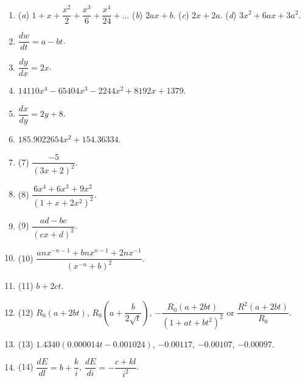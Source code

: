 \documentclass[a4paper,11pt,openany]{ltjsbook}
\begin{document}
\begin{enumerate}
\item[(1)] (\textit{a}) $1 + x + \dfrac{x^2}{2} + \dfrac{x^3}{6} + \dfrac{x^4}{24} + \ldots$ \qquad
    (\textit{b}) $2ax + b$. \qquad (\textit{c}) $2x + 2a$.
    (\textit{d}) $3x^2 + 6ax + 3a^2$.
\item[(2)] $\dfrac{dw}{dt} = a - bt$.
\item[(3)] $\dfrac{dy}{dx} = 2x$.
\item[(4)] $14110x^4 - 65404x^3 - 2244x^2 + 8192x + 1379$.
\item[(5)] $\dfrac{dx}{dy} = 2y + 8$.
\item[(6)] $185.9022654x^2 + 154.36334$.
\item (7) \(\dfrac{-5}{(3x + 2)^2}\).
\item (8) \(\dfrac{6x^4 + 6x^3 + 9x^2}{(1 + x + 2x^2)^2}\).
\item (9) \(\dfrac{ad - bc}{(cx + d)^2}\).
\item (10) \(\dfrac{anx^{-n-1} + bnx^{n-1} + 2nx^{-1}}{(x^{-n} + b)^2}\).
\item (11) \(b + 2ct\).
\item (12) \(R_0(a + 2bt)\), \quad \(R_0 \left(a + \dfrac{b}{2\sqrt{t}}\right)\), \quad \(-\dfrac{R_0(a + 2bt)}{(1 + at + bt^2)^2}\) \quad or \quad \(\dfrac{R^2 (a + 2bt)}{R_0}\).
\item (13) \(1.4340(0.000014t - 0.001024)\), \quad \(-0.00117\), \quad \(-0.00107\), \quad \(-0.00097\).
\item (14) \(\dfrac{dE}{dl} = b + \dfrac{k}{i}\), \quad \(\dfrac{dE}{di} = -\dfrac{c + kl}{i^2}\).
\end{enumerate}
\par\bigskip\noindent{\Large\bfseries [演習 IV の解答]}\par\smallskip
\end{document}
